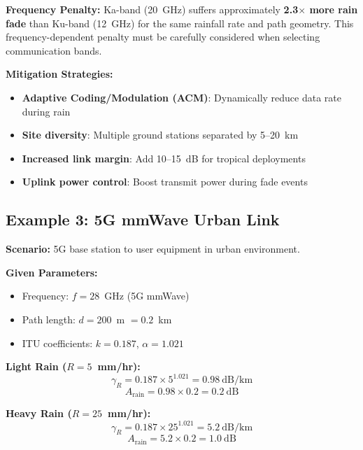 \begin{keyconcept}
\textbf{Frequency Penalty:} Ka-band (20~GHz) suffers approximately \textbf{2.3$\times$ more rain fade} than Ku-band (12~GHz) for the same rainfall rate and path geometry. This frequency-dependent penalty must be carefully considered when selecting communication bands.
\end{keyconcept}

\textbf{Mitigation Strategies:}
\begin{itemize}
\item \textbf{Adaptive Coding/Modulation (ACM)}: Dynamically reduce data rate during rain
\item \textbf{Site diversity}: Multiple ground stations separated by 5--20~km
\item \textbf{Increased link margin}: Add 10--15~dB for tropical deployments
\item \textbf{Uplink power control}: Boost transmit power during fade events
\end{itemize}

\subsection{Example 3: 5G mmWave Urban Link}

\textbf{Scenario:} 5G base station to user equipment in urban environment.

\vspace{6pt}
\textbf{Given Parameters:}
\begin{itemize}
\item Frequency: $f = 28$~GHz (5G mmWave)
\item Path length: $d = 200$~m $= 0.2$~km
\item ITU coefficients: $k = 0.187$, $\alpha = 1.021$
\end{itemize}

\vspace{6pt}
\textbf{Light Rain ($R = 5$~mm/hr):}
\begin{equation}
\gamma_R = 0.187 \times 5^{1.021} = 0.98~\text{dB/km}
\end{equation}
\begin{equation}
A_{\text{rain}} = 0.98 \times 0.2 = 0.2~\text{dB}
\end{equation}

\textbf{Heavy Rain ($R = 25$~mm/hr):}
\begin{equation}
\gamma_R = 0.187 \times 25^{1.021} = 5.2~\text{dB/km}
\end{equation}
\begin{equation}
A_{\text{rain}} = 5.2 \times 0.2 = 1.0~\text{dB}
\end{equation}

